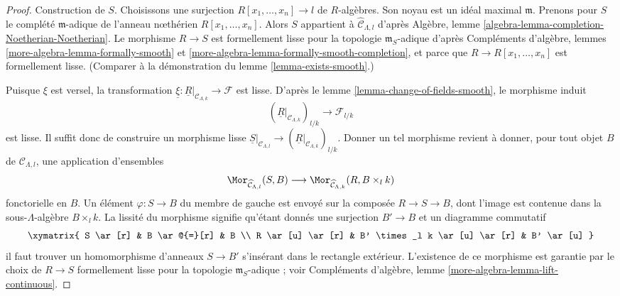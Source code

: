 \begin{proof}
Construction de $S$. Choisissons une surjection
$R[x_1, \ldots, x_n] \to l$ de $R$-algèbres. Son noyau est un idéal maximal
$\mathfrak m$.
Prenons pour $S$ le complété $\mathfrak m$-adique de l'anneau nœthérien
$R[x_1, \ldots, x_n]$. Alors $S$ appartient à
$\widehat{\mathcal{C}}_{\Lambda, l}$ d'après Algèbre, lemme
\ref{algebra-lemma-completion-Noetherian-Noetherian}. Le morphisme $R \to S$
est formellement lisse pour la topologie $\mathfrak m_S$-adique d'après
Compléments d'algèbre, lemmes \ref{more-algebra-lemma-formally-smooth} et
\ref{more-algebra-lemma-formally-smooth-completion}, et parce que
$R \to R[x_1, \ldots, x_n]$ est formellement lisse. (Comparer à la
démonstration du lemme \ref{lemma-exists-smooth}.)

\medskip\noindent
Puisque $\xi$ est versel, la transformation
$\underline{\xi} : \underline{R}|_{\mathcal{C}_{\Lambda, k}} \to \mathcal{F}$
est lisse. D'après le lemme \ref{lemma-change-of-fields-smooth}, le morphisme
induit
$$
(\underline{R}|_{\mathcal{C}_{\Lambda, k}})_{l/k}
\longrightarrow
\mathcal{F}_{l/k}
$$
est lisse. Il suffit donc de construire un morphisme lisse
$\underline{S}|_{\mathcal{C}_{\Lambda, l}} \to
(\underline{R}|_{\mathcal{C}_{\Lambda, k}})_{l/k}$. Donner un tel morphisme
revient à donner, pour tout objet $B$ de $\mathcal{C}_{\Lambda, l}$, une
application d'ensembles
$$
\Mor_{\widehat{\mathcal{C}}_{\Lambda, l}}(S, B)
\longrightarrow
\Mor_{\widehat{\mathcal{C}}_{\Lambda, k}}(R, B \times_l k)
$$
fonctorielle en $B$. Un élément $\varphi : S \to B$ du membre de gauche est
envoyé sur la composée $R \to S \to B$, dont l'image est contenue dans la
sous-$\Lambda$-algèbre $B \times_l k$. La lissité du morphisme signifie
qu'étant donnés une surjection $B' \to B$ et un diagramme commutatif
$$
\xymatrix{
S \ar[r] & B \ar@{=}[r] & B \\
R \ar[u] \ar[r] & B' \times_l k \ar[u] \ar[r] & B' \ar[u]
}
$$
il faut trouver un homomorphisme d'anneaux $S \to B'$ s'insérant dans le
rectangle extérieur. L'existence de ce morphisme est garantie par le choix de
$R \to S$ formellement lisse pour la topologie $\mathfrak m_S$-adique ; voir
Compléments d'algèbre, lemme \ref{more-algebra-lemma-lift-continuous}.
\end{proof}



























